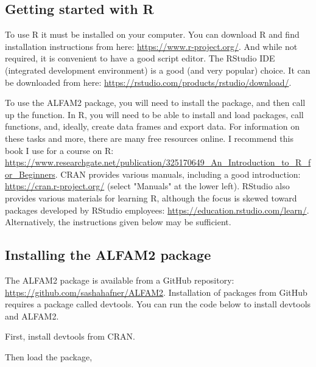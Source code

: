 \documentclass{article}
\begin{document}
\subsection{Getting started with R}
To use R it must be installed on your computer.
You can download R and find installation instructions from here: \url{https://www.r-project.org/}.
And while not required, it is convenient to have a good script editor.
The RStudio IDE (integrated development environment) is a good (and very popular) choice.
It can be downloaded from here: \url{https://rstudio.com/products/rstudio/download/}.

To use the ALFAM2 package, you will need to install the package, and then call up the function. 
In R, you will need to be able to install and load packages, call functions, and, ideally, create data frames and export data.
For information on these tasks and more, there are many free resources online. 
I recommend this book I use for a course on R: \url{https://www.researchgate.net/publication/325170649_An_Introduction_to_R_for_Beginners}.
CRAN provides various manuals, including a good introduction: \url{https://cran.r-project.org/} (select "Manuals" at the lower left).
RStudio also provides various materials for learning R, although the focus is skewed toward packages developed by RStudio employees: \url{https://education.rstudio.com/learn/}.
Alternatively, the instructions given below may be sufficient.

\subsection{Installing the ALFAM2 package}
The ALFAM2 package is available from a GitHub repository: \url{https://github.com/sashahafner/ALFAM2}.
Installation of packages from GitHub requires a package called devtools.
You can run the code below to install devtools and ALFAM2.

First, install devtools from CRAN.

\begin{knitrout}
\color{fgcolor}\begin{kframe}
\begin{alltt}
\hlstd{(}\hlstd{)}
\end{alltt}
\end{kframe}
\end{knitrout}

Then load the package,
\end{document}
